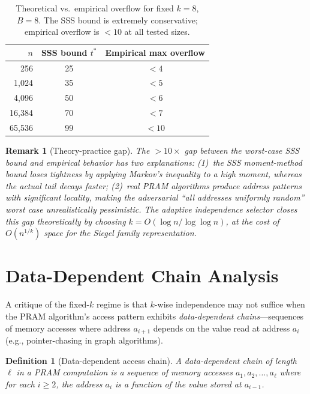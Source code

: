 \documentclass[11pt]{article}
\newtheorem{definition}[theorem]{Definition}
\newtheorem{remark}[theorem]{Remark}
\begin{document}
\begin{table}[h]
\centering
\caption{Theoretical vs.\ empirical overflow for fixed $k = 8$, $B = 8$.
  The SSS bound is extremely conservative; empirical overflow is $< 10$
  at all tested sizes.}
\label{tab:fixedk}
\begin{tabular}{@{}rcc@{}}
\toprule
$n$ & \textbf{SSS bound $t^*$} & \textbf{Empirical max overflow} \\
\midrule
256 & 25 & $< 4$ \\
1,024 & 35 & $< 5$ \\
4,096 & 50 & $< 6$ \\
16,384 & 70 & $< 7$ \\
65,536 & 99 & $< 10$ \\
\bottomrule
\end{tabular}
\end{table}

\begin{remark}[Theory-practice gap]
The $> 10\times$ gap between the worst-case SSS bound and empirical behavior
has two explanations: (1)~the SSS moment-method bound loses tightness by
applying Markov's inequality to a high moment, whereas the actual tail
decays faster; (2)~real PRAM algorithms produce address patterns with
significant locality, making the adversarial ``all addresses uniformly random''
worst case unrealistically pessimistic.  The adaptive independence selector
closes this gap theoretically by choosing $k = O(\log n / \log\log n)$,
at the cost of $O(n^{1/k})$ space for the Siegel family representation.
\end{remark}

\section{Data-Dependent Chain Analysis}
\label{app:datadep}

A critique of the fixed-$k$ regime is that $k$-wise independence may not
suffice when the PRAM algorithm's access pattern exhibits
\emph{data-dependent chains}---sequences of memory accesses where
address $a_{i+1}$ depends on the value read at address $a_i$ (e.g.,
pointer-chasing in graph algorithms).

\begin{definition}[Data-dependent access chain]
A \emph{data-dependent chain} of length $\ell$ in a PRAM computation is a
sequence of memory accesses $a_1, a_2, \ldots, a_\ell$ where for each
$i \ge 2$, the address $a_i$ is a function of the value stored at $a_{i-1}$.
\end{definition}
\end{document}
